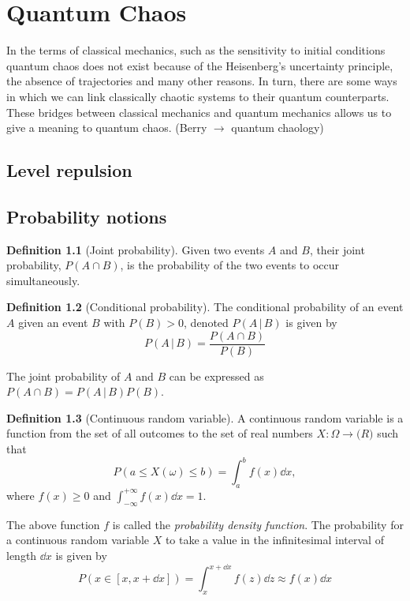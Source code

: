 \documentclass[../thesis.tex]{subfiles}
\theoremstyle{definition}
\newtheorem*{def*}{Definition}
\begin{document}
\chapter{Quantum Chaos}

In the terms of classical mechanics, such as the sensitivity to initial conditions
quantum chaos does not exist because of the Heisenberg's uncertainty principle,
the absence of trajectories and many other reasons. In turn, there are some
ways in which we can link classically chaotic systems to their
quantum counterparts. These bridges between classical mechanics and quantum
mechanics allows us to give a meaning to quantum chaos.
{\color{red} (Berry $\to$ quantum chaology)}

\section{Level repulsion}



\section{Probability notions}

\begin{def*}[Joint probability]
  Given two events $A$ and $B$, their joint probability, \(P(A \cap B)\), is
  the probability of the two events to occur simultaneously.
\end{def*}

\begin{def*}[Conditional probability]
  The conditional probability of an event $A$ given an event $B$ with \(P(B)>0\),
  denoted \(P(A\,|\,B)\) is given by
  \[
    P(A\,|\,B) = \frac{P(A \cap B)}{P(B)}
  \]
\end{def*}

The joint probability of $A$ and $B$ can be expressed as
\(P(A \cap B) = P(A\,|\,B) P(B)\).

\begin{def*}[Continuous random variable]
  A continuous random variable is a function from the set of all outcomes to the
  set of real numbers \(X:\Omega \to \mathbb(R)\) such that
  \[
    P(a \leq X(\omega) \leq b) = \int_a^b f(x) \dd{x},
  \]
  where \(f(x) \geq 0\) and \(\int_{-\infty}^{+\infty}f(x)\dd{x}=1\).
\end{def*}
The above function \(f\) is called the \emph{probability density function}.
The probability for a continuous random variable $X$ to take a value in the
infinitesimal interval of length \(\dd{x}\) is given by
\begin{equation}
  \label{eq:prob-rv-in-int}
  P(x \in [x, x + \dd{x}]) = \int_x^{x+\dd{x}} f(z) \dd{z} \approx f(x)\dd{x}
\end{equation}
\end{document}
